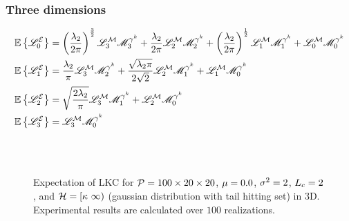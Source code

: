 \documentclass[12pt]{article}
\begin{document}
\subsubsection{Three dimensions}
\begin{subequations}
\begin{align}
  \mathbb{E}\left\{\mathscr{L}_0^{\mathcal{E}}\right\} &= \left(\frac{\lambda_2}{2\pi}\right)^\frac{3}{2}\mathscr{L}_3^{\mathcal{M}}\mathscr{M}^{\gamma^k}_3 +\frac{\lambda_2}{2\pi}\mathscr{L}_2^{\mathcal{M}}\mathscr{M}^{\gamma^k}_2 + \left(\frac{\lambda_2}{2\pi}\right)^\frac{1}{2}\mathscr{L}_1^{\mathcal{M}}\mathscr{M}^{\gamma^k}_1 + \mathscr{L}_0^{\mathcal{M}}\mathscr{M}^{\gamma^k}_0\\
  \mathbb{E}\left\{\mathscr{L}_1^{\mathcal{E}}\right\} &= \frac{\lambda_2}{\pi}\mathscr{L}_3^{\mathcal{M}}\mathscr{M}^{\gamma^k}_2 + \frac{\sqrt{\lambda_2\pi}}{2\sqrt{2}}\mathscr{L}_2^{\mathcal{M}}\mathscr{M}^{\gamma^k}_1 + \mathscr{L}_1^{\mathcal{M}}\mathscr{M}^{\gamma^k}_0\\
  \mathbb{E}\left\{\mathscr{L}_2^{\mathcal{E}}\right\} &= \sqrt{\frac{2\lambda_2}{\pi}}\mathscr{L}_3^{\mathcal{M}}\mathscr{M}^{\gamma^k}_1 + \mathscr{L}_2^{\mathcal{M}}\mathscr{M}^{\gamma^k}_0\\
  \mathbb{E}\left\{\mathscr{L}_3^{\mathcal{E}}\right\} &= \mathscr{L}_3^{\mathcal{M}}\mathscr{M}^{\gamma^k}_0
\end{align}
\end{subequations}


\begin{figure}[!h]
  \centering
  \subfigure{\scalebox{0.5}{}}\hspace{1.2cm}
  \subfigure{\scalebox{0.5}{}}\\
  \subfigure{\scalebox{0.5}{}}\hspace{1.2cm}
  \subfigure{\scalebox{0.5}{}}\\
  \caption{Expectation of LKC for $\mathcal{P}=100\times 20 \times 20$, $\mu=0.0$, $\sigma^2=2$, $L_c=2$, and $\mathcal{H}=[\kappa\ \infty)$ (gaussian distribution with tail hitting set) in 3D. Experimental results are calculated over $100$ realizations.}
\end{figure}
\end{document}
